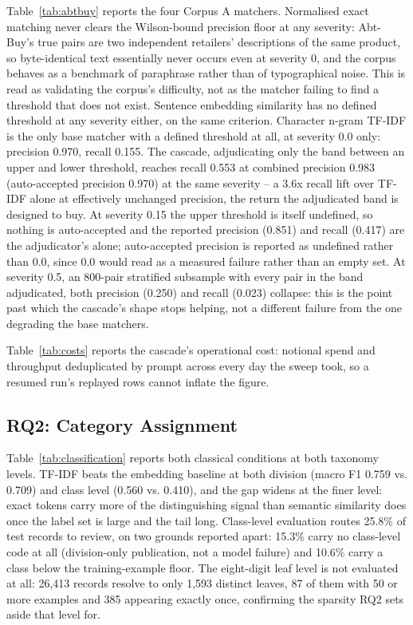 \documentclass[conference]{IEEEtran}
\begin{document}
Table~\ref{tab:abtbuy} reports the four Corpus A matchers. Normalised
exact matching never clears the Wilson-bound precision floor at any
severity: Abt-Buy's true pairs are two independent retailers'
descriptions of the same product, so byte-identical text essentially
never occurs even at severity 0, and the corpus behaves as a benchmark
of paraphrase rather than of typographical noise. This is read as
validating the corpus's difficulty, not as the matcher failing to find
a threshold that does not exist. Sentence embedding similarity has no
defined threshold at any severity either, on the same criterion.
Character n-gram TF-IDF is the only base matcher with a defined
threshold at all, at severity 0.0 only: precision 0.970, recall 0.155.
The cascade, adjudicating only the band between an upper and lower
threshold, reaches recall 0.553 at combined precision 0.983 (auto-accepted
precision 0.970) at the same severity -- a 3.6x recall lift over TF-IDF
alone at effectively unchanged precision, the return the adjudicated
band is designed to buy. At severity 0.15 the upper threshold is itself
undefined, so nothing is auto-accepted and the reported precision
(0.851) and recall (0.417) are the adjudicator's alone; auto-accepted
precision is reported as undefined rather than 0.0, since 0.0 would
read as a measured failure rather than an empty set. At severity 0.5,
an 800-pair stratified subsample with every pair in the band
adjudicated, both precision (0.250) and recall (0.023) collapse: this
is the point past which the cascade's shape stops helping, not a
different failure from the one degrading the base matchers.



Table~\ref{tab:costs} reports the cascade's operational cost: notional
spend and throughput deduplicated by prompt across every day the sweep
took, so a resumed run's replayed rows cannot inflate the figure.

\subsection{RQ2: Category Assignment}

Table~\ref{tab:classification} reports both classical conditions at
both taxonomy levels. TF-IDF beats the embedding baseline at both
division (macro F1 0.759 vs. 0.709) and class level (0.560 vs. 0.410),
and the gap widens at the finer level: exact tokens carry more of the
distinguishing signal than semantic similarity does once the label set
is large and the tail long. Class-level evaluation routes 25.8\% of
test records to review, on two grounds reported apart: 15.3\% carry no
class-level code at all (division-only publication, not a model
failure) and 10.6\% carry a class below the training-example floor.
The eight-digit leaf level is not evaluated at all: 26,413 records
resolve to only 1,593 distinct leaves, 87 of them with 50 or more
examples and 385 appearing exactly once, confirming the sparsity RQ2
sets aside that level for.
\end{document}
